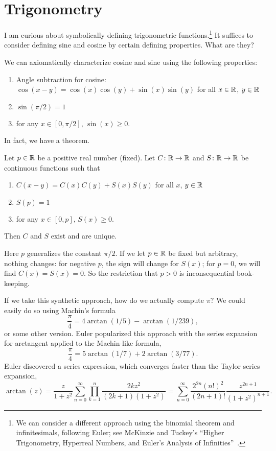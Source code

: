 \chapter{Trigonometry}

\M I am curious about symbolically defining trigonometric
functions.\footnote{We can consider a different approach using the
binomial theorem and infinitesimals, following Euler; see McKinzie and
Tuckey's ``Higher Trigonometry, Hyperreal Numbers, and Euler’s Analysis of Infinities''~\cite{mckinzie}.} It
suffices to consider defining sine and cosine by certain defining
properties. What are they?

We can axiomatically characterize cosine and sine using the following
properties:
\begin{enumerate}
\item Angle subtraction for cosine: $\cos(x-y) = \cos(x)\cos(y) + \sin(x)\sin(y)$ for all $x\in\mathbb{R}$, $y\in\mathbb{R}$
\item $\sin(\pi/2)=1$
\item for any $x\in[0,\pi/2]$, $\sin(x)\geq0$.
\end{enumerate}
In fact, we have a theorem.

\begin{theorem}
Let $p\in\mathbb{R}$ be a positive real number (fixed). Let $C\colon\mathbb{R}\to\mathbb{R}$
and $S\colon\mathbb{R}\to\mathbb{R}$ be continuous functions such that
\begin{enumerate}
\item $C(x-y) = C(x)C(y) + S(x)S(y)$ for all $x$, $y\in\mathbb{R}$
\item $S(p)=1$
\item for any $x\in[0,p]$, $S(x)\geq0$.
\end{enumerate}
Then $C$ and $S$ exist and are unique.
\end{theorem}

Here $p$ generalizes the constant $\pi/2$. If we let $p\in\mathbb{R}$ be fixed
but arbitrary, nothing changes: for negative $p$, the sign will change
for $S(x)$; for $p=0$, we will find $C(x)=S(x)=0$. So the restriction
that $p>0$ is inconsequential book-keeping.

If we take this synthetic approach, how do we actually compute $\pi$? We
could easily do so using Machin's formula
\begin{equation}
\frac{\pi}{4} = 4\arctan(1/5) - \arctan(1/239),
\end{equation}
or some other version. Euler popularized this approach with the series
expansion for arctangent applied to the Machin-like formula,
\begin{equation}
\frac{\pi}{4} = 5\arctan(1/7) + 2 \arctan(3/77).
\end{equation}
Euler discovered a series expression, which converges faster than the
Taylor series expansion,
\begin{equation}
\arctan(z) = \frac{z}{1 + z^{2}}\sum^{\infty}_{n=0}\prod^{n}_{k=1}\frac{2kz^{2}}{(2k + 1)(1 + z^{2})}
= \sum^{\infty}_{n = 0}\frac{2^{2n}(n!)^{2}}{(2n + 1)!}\frac{z^{2n + 1}}{(1 + z^{2})^{n+1}}.
\end{equation}


